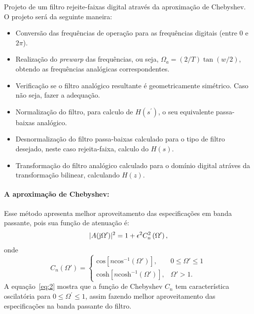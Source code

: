 \documentclass{homeworkclass}
\begin{document}
\begin{homeworkProblem}
	Projeto de um filtro rejeite-faixas digital através da aproximação de Chebyshev. \\
	
	O projeto será da seguinte maneira:
	\begin{itemize}
		\item Conversão das frequências de operação para as frequências digitais (entre $0$ e $2\pi$).
		\item Realização do \textit{prewarp} das frequências, ou seja, $\Omega_{a} = (2/T)\tan(w/2)$, obtendo as frequências analógicas correspondentes.
		\item Verificação se o filtro analógico resultante é geometricamente simétrico. Caso não seja, fazer a adequação.
		\item Normalização do filtro, para calculo de $H(s^{\prime})$, o seu equivalente passa-baixas analógico.
		\item Desnormalização do filtro passa-baixas calculado para o tipo de filtro desejado, neste caso rejeita-faixa, calculo do $H(s)$.
		\item Transformação do filtro analógico calculado para o domínio digital atráves da transformação bilinear, calculando $H(z)$.
	\end{itemize}
	
	\paragraph{A aproximação de Chebyshev:} Esse método apresenta melhor aproveitamento das especificações em banda passante, pois sua função de atenuação é:
	\begin{equation}
	|A(\mathrm{j} \Omega^{\prime})|^{2} = 1 + \epsilon^{2}C_{n}^{2}\left(\Omega^{\prime}\right),
	\end{equation}
	onde 
	\begin{equation}
	C_n(\Omega')=
	\begin{cases}
	\textrm{cos}[n\textrm{cos}^{-1}(\Omega')], \quad & 0 \leq \Omega' \leq 1\\
	\textrm{cosh}[n\textrm{cosh}^{-1}(\Omega')], & \Omega'>1.
	\end{cases}
	\label{eq:2}
	\end{equation}
	A equação~\eqref{eq:2} mostra que a função de Chebyshev $C_{n}$ tem característica oscilatória para $0 \leq \Omega^{\prime} \leq 1$, assim fazendo melhor aproveitamento das especificações na banda passante do filtro.
	

\end{homeworkProblem}
\end{document}
